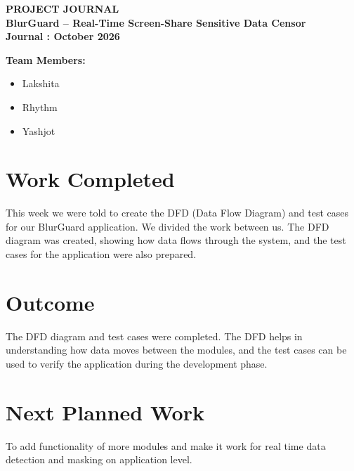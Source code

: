 \documentclass[12pt,a4paper]{article}
\begin{document}
\begin{center}
    {\Large\bfseries PROJECT JOURNAL}\\[10pt]
    {\large\bfseries BlurGuard -- Real-Time Screen-Share Sensitive Data Censor}\\[10pt]
    {\bfseries Journal : October 2026}
\end{center}

\vspace{6pt}

\textbf{Team Members:}
\begin{itemize}[topsep=2pt,itemsep=0pt]
    \item Lakshita
    \item Rhythm
    \item Yashjot
\end{itemize}

\section*{Work Completed}
This week we were told to create the DFD (Data Flow Diagram) and test cases for our BlurGuard application. We divided the work between us. The DFD diagram was created, showing how data flows through the system, and the test cases for the application were also prepared.

\section*{Outcome}
The DFD diagram and test cases were completed. The DFD helps in understanding how data moves between the modules, and the test cases can be used to verify the application during the development phase.

\section*{Next Planned Work}
To add functionality of more modules and make it work for real time data detection and masking on application level.
\end{document}
